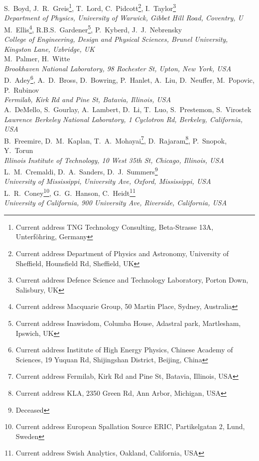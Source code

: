 S.~Boyd,  J.~R.~Greis\footnote{Current address TNG Technology Consulting, Beta-Strasse 13A, Unterf\"{o}hring, Germany}, T.~Lord, C.~Pidcott\footnote{Current address Department of Physics and Astronomy, University of Sheffield, Hounsfield Rd, Sheffield, UK}, I.~Taylor\footnote{Current address Defence Science and Technology Laboratory, Porton Down, Salisbury, UK}
\\{\it
Department of Physics, University of Warwick, Gibbet Hill Road, Coventry, U
}\\

M.~Ellis\footnote{Current address Macquarie Group, 50 Martin Place, Sydney, Australia}, R.B.S.~Gardener\footnote{Current address Inawisdom, Columba House, Adastral park, Martlesham, Ipswich, UK}, P.~Kyberd, J.~J.~Nebrensky
\\{\it
College of Engineering, Design and Physical Sciences, Brunel University, Kingston Lane, Uxbridge, UK
}\\

M.~Palmer, H.~Witte
\\{\it
Brookhaven National Laboratory, 98 Rochester St, Upton, New York, USA
}\\

D.~Adey\footnote{Current address Institute of High Energy Physics, Chinese Academy of Sciences, 19 Yuquan Rd, Shijingshan District, Beijing, China}, A.~D.~Bross, D.~Bowring, P.~Hanlet, A.~Liu\footnotemark{}\setcounter{FNEuclid}{\value{footnote}}, D.~Neuffer, M.~Popovic, P.~Rubinov
\\{\it
Fermilab, Kirk Rd and Pine St, Batavia, Illinois, USA
}\\

A.~DeMello, S.~Gourlay, A.~Lambert, D.~Li, T.~Luo, S.~Prestemon,  S.~Virostek
\\{\it
Lawrence Berkeley National Laboratory, 1 Cyclotron Rd, Berkeley, California, USA
}\\

B.~Freemire\footnotemark[\value{FNEuclid}], D.~M.~Kaplan, T.~A.~Mohayai\footnote{Current address Fermilab, Kirk Rd and Pine St, Batavia, Illinois, USA}, D.~Rajaram\footnote{Current address KLA, 2350 Green Rd, Ann Arbor, Michigan, USA}, P.~Snopok, Y.~Torun
\\{\it
Illinois Institute of Technology, 10 West 35th St, Chicago, Illinois, USA
}\\

L.~M.~Cremaldi, D.~A.~Sanders, D.~J.~Summers\footnote{Deceased}
\\{\it
University of Mississippi, University Ave, Oxford, Mississippi, USA
}\\

L.~R.~Coney\footnote{Current address European Spallation Source ERIC, Partikelgatan 2, Lund, Sweden}, G.~G.~Hanson, C.~Heidt\footnote{Current address Swish Analytics, Oakland, California, USA}
\\{\it
University of California, 900 University Ave, Riverside, California, USA
}\\
